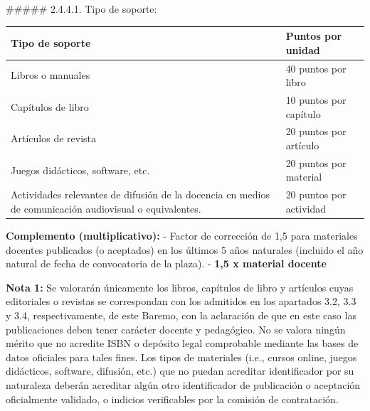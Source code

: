 \documentclass{article}
\begin{document}
\begin{itemize}
\begin{itemize}
\begin{scriptsize}
                  \#\#\#\#\# 2.4.4.1. Tipo de soporte:
                  \vspace{0.4cm}
                  \begin{table}[h!]\centering\renewcommand{\arraystretch}{1.3}
                    \begin{tabular}{|p{}|p{}|}\hline
                      Tipo de soporte                                                                                         & Puntos por unidad       \\\hline
                      Libros o manuales                                                                                       & 40 puntos por libro     \\\hline
                      Capítulos de libro                                                                                      & 10 puntos por capítulo  \\\hline
                      Artículos de revista                                                                                    & 20 puntos por artículo  \\\hline
                      Juegos didácticos, software, etc.                                                                       & 20 puntos por material  \\\hline
                      Actividades relevantes de difusión de la docencia en medios de comunicación audiovisual o equivalentes. & 20 puntos por actividad \\\hline
                    \end{tabular}\end{table}
                  \vspace{0.4cm}

                  \textbf{Complemento (multiplicativo):}
                  - Factor de corrección de 1,5 para materiales docentes publicados (o aceptados) en los últimos 5 años naturales (incluido el año natural de fecha de convocatoria de la plaza).
                  - \textbf{1,5 x material docente}

                  \textbf{Nota 1:} Se valorarán únicamente los libros, capítulos de libro y artículos cuyas editoriales o revistas se correspondan con los admitidos en los apartados 3.2, 3.3 y 3.4, respectivamente, de este Baremo, con la aclaración de que en este caso las publicaciones deben tener carácter docente y pedagógico. No se valora ningún mérito que no acredite ISBN o depósito legal comprobable mediante las bases de datos oficiales para tales fines. Los tipos de materiales (i.e., cursos online, juegos didácticos, software, difusión, etc.) que no puedan acreditar identificador por su naturaleza deberán acreditar algún otro identificador de publicación o aceptación oficialmente validado, o indicios verificables por la comisión de contratación.


\end{scriptsize}
\end{itemize}
\end{itemize}
\end{document}
